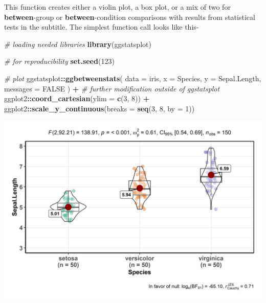 \documentclass[]{article}
\newenvironment{Shaded}{\begin{snugshade}}{\end{snugshade}}
\newcommand{\CommentTok}[1]{\textcolor[rgb]{0.56,0.35,0.01}{\textit{#1}}}
\newcommand{\DataTypeTok}[1]{\textcolor[rgb]{0.13,0.29,0.53}{#1}}
\newcommand{\DecValTok}[1]{\textcolor[rgb]{0.00,0.00,0.81}{#1}}
\newcommand{\KeywordTok}[1]{\textcolor[rgb]{0.13,0.29,0.53}{\textbf{#1}}}
\newcommand{\NormalTok}[1]{#1}
\newcommand{\OperatorTok}[1]{\textcolor[rgb]{0.81,0.36,0.00}{\textbf{#1}}}
\newcommand{\OtherTok}[1]{\textcolor[rgb]{0.56,0.35,0.01}{#1}}
\newcommand{\StringTok}[1]{\textcolor[rgb]{0.31,0.60,0.02}{#1}}
\begin{document}
This function creates either a violin plot, a box plot, or a mix of two for
\textbf{between}-group or \textbf{between}-condition comparisons with results from
statistical tests in the subtitle. The simplest function call looks like this-

\begin{Shaded}
\begin{Highlighting}[]
\CommentTok{# loading needed libraries}
\KeywordTok{library}\NormalTok{(ggstatsplot)}

\CommentTok{# for reproducibility}
\KeywordTok{set.seed}\NormalTok{(}\DecValTok{123}\NormalTok{)}

\CommentTok{# plot}
\NormalTok{ggstatsplot}\OperatorTok{::}\KeywordTok{ggbetweenstats}\NormalTok{(}
  \DataTypeTok{data =}\NormalTok{ iris,}
  \DataTypeTok{x =}\NormalTok{ Species,}
  \DataTypeTok{y =}\NormalTok{ Sepal.Length,}
  \DataTypeTok{messages =} \OtherTok{FALSE}
\NormalTok{) }\OperatorTok{+}\StringTok{ }\CommentTok{# further modification outside of ggstatsplot}
\StringTok{  }\NormalTok{ggplot2}\OperatorTok{::}\KeywordTok{coord_cartesian}\NormalTok{(}\DataTypeTok{ylim =} \KeywordTok{c}\NormalTok{(}\DecValTok{3}\NormalTok{, }\DecValTok{8}\NormalTok{)) }\OperatorTok{+}
\StringTok{  }\NormalTok{ggplot2}\OperatorTok{::}\KeywordTok{scale_y_continuous}\NormalTok{(}\DataTypeTok{breaks =} \KeywordTok{seq}\NormalTok{(}\DecValTok{3}\NormalTok{, }\DecValTok{8}\NormalTok{, }\DataTypeTok{by =} \DecValTok{1}\NormalTok{))}
\end{Highlighting}
\end{Shaded}

\includegraphics[width=1\linewidth]{./figures/paper-ggbetweenstats1-1}
\end{document}
